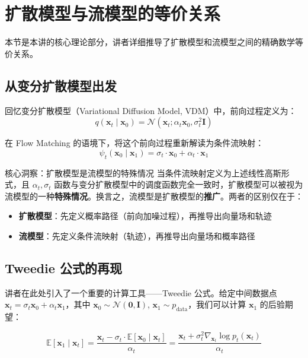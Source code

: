 \section{扩散模型与流模型的等价关系}

本节是本讲的核心理论部分，讲者详细推导了扩散模型和流模型之间的精确数学等价关系。

\subsection{从变分扩散模型出发}

回忆变分扩散模型（Variational Diffusion Model, VDM）中，前向过程定义为：
$$q(\mathbf{x}_t \mid \mathbf{x}_0) = \mathcal{N}(\mathbf{x}_t; \alpha_t \mathbf{x}_0, \sigma_t^2 \mathbf{I})$$

在 Flow Matching 的语境下，将这个前向过程重新解读为条件流映射：
$$\psi_t(\mathbf{x}_0 \mid \mathbf{x}_1) = \sigma_t \cdot \mathbf{x}_0 + \alpha_t \cdot \mathbf{x}_1$$

\begin{importantbox}{核心洞察：扩散模型是流模型的特殊情况}
当条件流映射定义为上述线性高斯形式，且 $\alpha_t, \sigma_t$ 函数与变分扩散模型中的调度函数完全一致时，扩散模型可以被视为流模型的一种\textbf{特殊情况}。换言之，流模型是扩散模型的\textbf{推广}。两者的区别仅在于：
\begin{itemize}
    \item \textbf{扩散模型}：先定义概率路径（前向加噪过程），再推导出向量场和轨迹
    \item \textbf{流模型}：先定义条件流映射（轨迹），再推导出向量场和概率路径
\end{itemize}
\end{importantbox}

\subsection{Tweedie 公式的再现}

讲者在此处引入了一个重要的计算工具——Tweedie 公式。给定中间数据点 $\mathbf{x}_t = \sigma_t \mathbf{x}_0 + \alpha_t \mathbf{x}_1$，其中 $\mathbf{x}_0 \sim \mathcal{N}(\mathbf{0}, \mathbf{I})$, $\mathbf{x}_1 \sim p_{\text{data}}$，我们可以计算 $\mathbf{x}_1$ 的后验期望：

$$\mathbb{E}[\mathbf{x}_1 \mid \mathbf{x}_t] = \frac{\mathbf{x}_t - \sigma_t \cdot \mathbb{E}[\mathbf{x}_0 \mid \mathbf{x}_t]}{\alpha_t} = \frac{\mathbf{x}_t + \sigma_t^2 \nabla_{\mathbf{x}_t} \log p_t(\mathbf{x}_t)}{\alpha_t}$$

